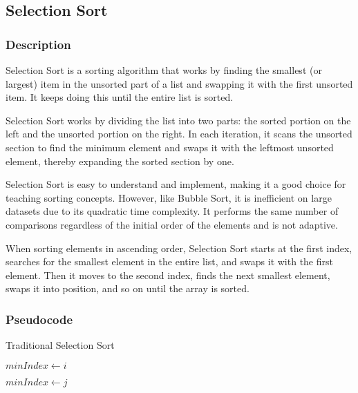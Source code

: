 \subsection{Selection Sort}

\subsubsection{Description}

Selection Sort is a sorting algorithm that works by finding the smallest (or largest) item in the unsorted part of a list and swapping it with the first unsorted item. It keeps doing this until the entire list is sorted.

Selection Sort works by dividing the list into two parts: the sorted portion on the left and the unsorted portion on the right. In each iteration, it scans the unsorted section to find the minimum element and swaps it with the leftmost unsorted element, thereby expanding the sorted section by one.

Selection Sort is easy to understand and implement, making it a good choice for teaching sorting concepts. However, like Bubble Sort, it is inefficient on large datasets due to its quadratic time complexity. It performs the same number of comparisons regardless of the initial order of the elements and is not adaptive.

When sorting elements in ascending order, Selection Sort starts at the first index, searches for the smallest element in the entire list, and swaps it with the first element. Then it moves to the second index, finds the next smallest element, swaps it into position, and so on until the array is sorted. 

\subsubsection{Pseudocode}
\begin{algorithm}
\caption{Traditional Selection Sort}
\begin{algorithmic}[1]
        \State{} $minIndex \gets i$
        
                \State{} $minIndex \gets j$
            \EndIf{}
        \EndFor{}

        \State{} 
    \EndFor{}
\EndProcedure{}
\end{algorithmic}
\end{algorithm}

